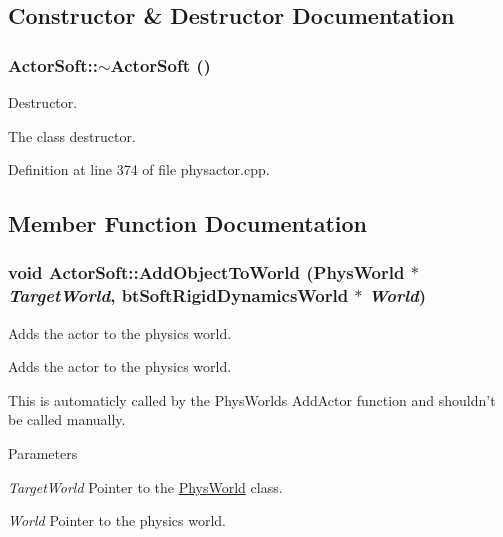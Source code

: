 \subsection{Constructor \& Destructor Documentation}
\hypertarget{classActorSoft_af58881c064fa2182a2347eb8755696b0}{
\subsubsection[{$\sim$ActorSoft}]{\setlength{\rightskip}{0pt plus 5cm}ActorSoft::$\sim$ActorSoft ()}}
\label{d5/da4/classActorSoft_af58881c064fa2182a2347eb8755696b0}


Destructor. 

The class destructor. 

Definition at line 374 of file physactor.cpp.



\subsection{Member Function Documentation}
\hypertarget{classActorSoft_a0def29f28ed4d126a0634ddc97e33e2f}{
\subsubsection[{AddObjectToWorld}]{\setlength{\rightskip}{0pt plus 5cm}void ActorSoft::AddObjectToWorld ({\bf PhysWorld} $\ast$ {\em TargetWorld}, \/  btSoftRigidDynamicsWorld $\ast$ {\em World})}}
\label{d5/da4/classActorSoft_a0def29f28ed4d126a0634ddc97e33e2f}


Adds the actor to the physics world. 

Adds the actor to the physics world. \par
 This is automaticly called by the PhysWorlds AddActor function and shouldn't be called manually. 
\begin{DoxyParams}{Parameters}
\item[{\em TargetWorld}]Pointer to the \hyperlink{classPhysWorld}{PhysWorld} class. \item[{\em World}]Pointer to the physics world. \end{DoxyParams}


